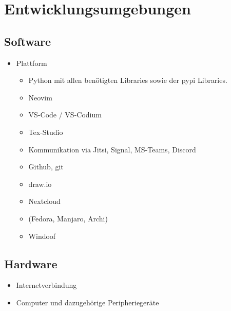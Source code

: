 \chapter{Entwicklungsumgebungen}

\section{Software}

\begin{itemize}
	\item Plattform
		\begin{itemize}
			\item Python mit allen benötigten Libraries sowie der pypi Libraries.
		\end{itemize}

		\begin{itemize}
			\item Neovim
			\item VS-Code / VS-Codium
			\item Tex-Studio
			\item Kommunikation via Jitsi, Signal, MS-Teams, Discord
			\item Github, git
			\item draw.io
			\item Nextcloud
			\item \Linux (Fedora, Manjaro, Archi) 
			\item Windoof
		\end{itemize}
\end{itemize}

\section{Hardware}

\begin{itemize}
	\item Internetverbindung
	\item Computer und dazugehörige Peripheriegeräte
\end{itemize}
